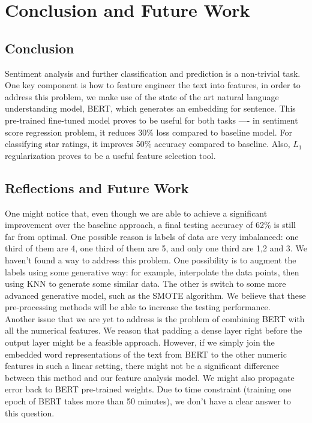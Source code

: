 \documentclass{article}
\begin{document}
\section{Conclusion and Future Work}
\subsection{Conclusion}

Sentiment analysis and further classification and prediction is a non-trivial task. One key component is how to feature engineer the text into features, in order to address this problem, we make use of the state of the art natural language understanding model, BERT, which generates an embedding for sentence. This pre-trained fine-tuned model proves to be useful for both tasks ---- in sentiment score regression problem, it reduces 30\% loss compared to baseline model. For classifying star ratings, it improves 50\% accuracy compared to baseline. Also, $L_1$ regularization proves to be a useful feature selection tool. \\

\subsection{Reflections and Future Work}
One might notice that, even though we are able to achieve a significant improvement over the baseline approach, a final testing accuracy of 62\% is still far from optimal. One possible reason is labels of data are very imbalanced: one third of them are 4, one third of them are 5, and only one third are 1,2 and 3. We haven’t found a way to address this problem. One possibility is to augment the labels using some generative way: for example, interpolate the data points, then using KNN to generate some similar data. The other is switch to some more advanced generative model, such as the SMOTE algorithm\cite{5}. 
 We believe that these pre-processing methods will be able to increase the testing performance. \\

Another issue that we are yet to address is the problem of combining BERT with all the numerical features. We reason that padding a dense layer right before the output layer might be a feasible approach. However, if we simply join the embedded word representations of the text from BERT to the other numeric features in such a linear setting, there might not be a significant difference between this method and our feature analysis model. We might also propagate error back to BERT pre-trained weights. Due to time constraint (training one epoch of BERT takes more than 50 minutes), we don’t have a clear answer to this question. \\












\end{document}
